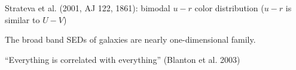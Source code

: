 \documentclass[letterpaper,landscape]{slides}
\begin{document}
\begin{slide}
\begin{center}
\end{center}
Strateva et al. (2001, AJ 122, 1861): {\color{red} bimodal $u-r$ color distribution} ($u-r$ is similar to $U-V$)
\vfill
\end{slide}

\begin{slide}
\begin{center}
\end{center}
{\color{blue} The broad band SEDs of galaxies are nearly one-dimensional family.}

{\color{red} ``Everything is correlated with everything'' (Blanton et al. 2003)}
\vfill
\end{slide}
\end{document}
